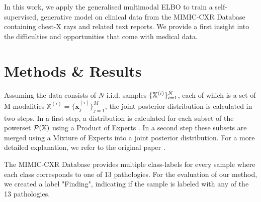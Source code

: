 \documentclass{midl} %
\begin{document}
In this work, we apply the generalised multimodal ELBO \citep{thomas_gener-ELBO} to train a self-supervised, generative model on clinical data from the MIMIC-CXR Database \citep{johnson2019mimic} containing chest-X rays and related text reports. 
We provide a first insight into the difficulties and opportunities that come with medical data.

\section{Methods \& Results}
Assuming the data consists of $N$ i.i.d. samples $\{\mathbb{X}^{(i)}\}^N_{i=1}$, each of which is a set of M modalities $\mathbb{X}^{(i)} = \{\textbf{x}_j^{(i)}\}^M_{j=1}$, the joint posterior distribution is calculated in two steps.
In a first step, a distribution is calculated for each subset of the powerset $\mathcal{P}(\mathbb{X})$ using a Product of Experts \citep[PoE]{wu2018multimodal}.
In a second step these subsets are merged using a Mixture of Experts \citep[MoE]{shi2019variational} into a joint posterior distribution. For a more detailed explanation, we refer to the original paper \citep{thomas_gener-ELBO}.

The MIMIC-CXR Database \citep{johnson2019mimic} provides multiple class-labels for every sample where each class corresponds to one of 13 pathologies.
For the evaluation of our method, we created a label "Finding", indicating if the sample is labeled with any of the 13 pathologies. 
\end{document}
